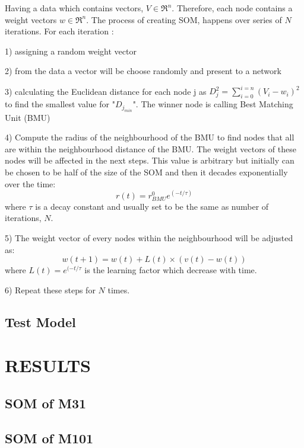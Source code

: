 \documentclass[useAMS,usenatbib]{mn2e}
\begin{document}
 Having a data which contains vectors, $V \in \Re^n$. Therefore, each node contains a weight vectors $w\in \Re^n$. The process of creating SOM, happens over series of $N$ iterations. For each iteration :
   
  1) assigning a random weight vector
  
  2) from the data a vector will be choose randomly and present to a network
  
  3) calculating the Euclidean distance for each node j as  $D_j^2= \sum_{i=0}^{i=n} (V_i - w_i)^2 $ to find the smallest value for "$D_{j_{min}}$". The winner node is calling Best Matching Unit (BMU)
  
  4) Compute the radius of the neighbourhood of the BMU to find nodes that all are within the neighbourhood distance of the BMU. The weight vectors of these nodes will be affected in the next steps. This value is arbitrary but initially can be chosen to be half of the size of the SOM and then it decades exponentially over the time:
   \begin{equation}
   r(t) = r^0_{BMU}e^{(-t/\tau)}
   \end{equation}
   where $\tau$ is a decay constant and usually set to be the same as number of iterations, $N$.
   
   5) The weight vector of every nodes within the neighbourhood will be adjusted as:
   \begin{equation}
   w(t+1)=w(t)+L(t) \times(v(t)-w(t))
   \end{equation}
   where $L(t) = e^{(-t/\tau}$ is the learning factor which decrease with time.
   
   6) Repeat these steps for $N$ times.
   
   
   
 \subsection{Test Model}

\section{RESULTS}
   \subsection{SOM of M31}
   \subsection{SOM of M101}
\end{document}
